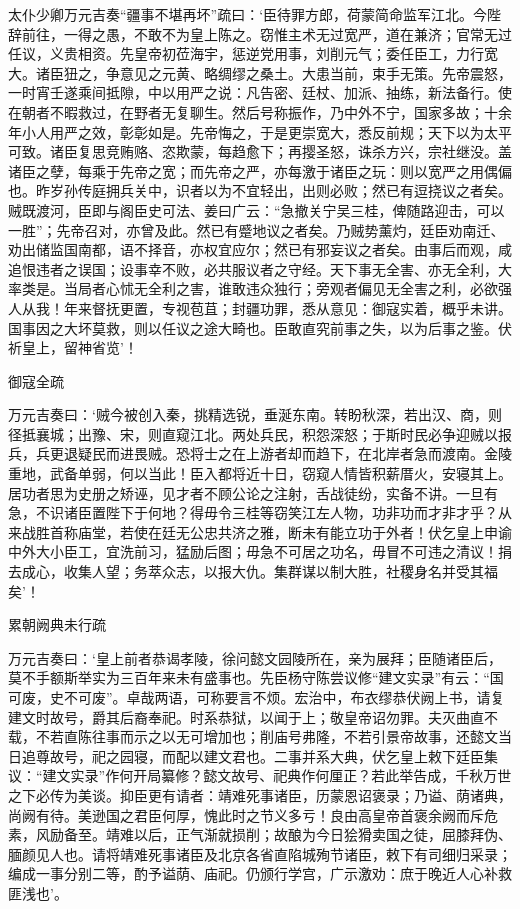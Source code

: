 \documentclass[]{article}
\begin{document}
太仆少卿万元吉奏``疆事不堪再坏''疏曰：`臣待罪方郎，荷蒙简命监军江北。今陛辞前往，一得之愚，不敢不为皇上陈之。窃惟主术无过宽严，道在兼济；官常无过任议，义贵相资。先皇帝初莅海宇，惩逆党用事，刘削元气；委任臣工，力行宽大。诸臣狃之，争意见之元黄、略绸缪之桑土。大患当前，束手无策。先帝震怒，一时宵壬遂乘间抵隙，中以用严之说：凡告密、廷杖、加派、抽练，新法备行。使在朝者不暇救过，在野者无复聊生。然后号称振作，乃中外不宁，国家多故；十余年小人用严之效，彰彰如是。先帝悔之，于是更崇宽大，悉反前规；天下以为太平可致。诸臣复思竞贿赂、恣欺蒙，每趋愈下；再撄圣怒，诛杀方兴，宗社继没。盖诸臣之孽，每乘于先帝之宽；而先帝之严，亦每激于诸臣之玩：则以宽严之用偶偏也。昨岁孙传庭拥兵关中，识者以为不宜轻出，出则必败；然已有逗挠议之者矣。贼既渡河，臣即与阁臣史可法、姜曰广云：``急撤关宁吴三桂，俾随路迎击，可以一胜''；先帝召对，亦曾及此。然已有蹙地议之者矣。乃贼势薰灼，廷臣劝南迁、劝出储监国南都，语不择音，亦权宜应尔；然已有邪妄议之者矣。由事后而观，咸追恨违者之误国；设事幸不败，必共服议者之守经。天下事无全害、亦无全利，大率类是。当局者心怵无全利之害，谁敢违众独行；旁观者偏见无全害之利，必欲强人从我！年来督抚更置，专视苞苴；封疆功罪，悉从意见：御寇实着，概乎未讲。国事因之大坏莫救，则以任议之途大畸也。臣敢直究前事之失，以为后事之鉴。伏祈皇上，留神省览'！

御寇全疏

万元吉奏曰：`贼今被创入秦，挑精选锐，垂涎东南。转盼秋深，若出汉、商，则径抵襄城；出豫、宋，则直窥江北。两处兵民，积怨深怒；于斯时民必争迎贼以报兵，兵更退疑民而进畏贼。恐将士之在上游者却而趋下，在北岸者急而渡南。金陵重地，武备单弱，何以当此！臣入都将近十日，窃窥人情皆积薪厝火，安寝其上。居功者思为史册之矫诬，见才者不顾公论之注射，舌战徒纷，实备不讲。一旦有急，不识诸臣置陛下于何地？得毋令三桂等窃笑江左人物，功非功而才非才乎？从来战胜首称庙堂，若使在廷无公忠共济之雅，断未有能立功于外者！伏乞皇上申谕中外大小臣工，宜洗前习，猛励后图；毋急不可居之功名，毋冒不可违之清议！捐去成心，收集人望；务萃众志，以报大仇。集群谋以制大胜，社稷身名并受其福矣'！

累朝阙典未行疏

万元吉奏曰：`皇上前者恭谒孝陵，徐问懿文园陵所在，亲为展拜；臣随诸臣后，莫不手额斯举实为三百年来未有盛事也。先臣杨守陈尝议修``建文实录''有云：``国可废，史不可废''。卓哉两语，可称要言不烦。宏治中，布衣缪恭伏阙上书，请复建文时故号，爵其后裔奉祀。时系恭狱，以闻于上；敬皇帝诏勿罪。夫灭曲直不载，不若直陈往事而示之以无可增加也；削庙号弗隆，不若引景帝故事，还懿文当日追尊故号，祀之园寝，而配以建文君也。二事并系大典，伏乞皇上敕下廷臣集议：``建文实录''作何开局纂修？懿文故号、祀典作何厘正？若此举告成，千秋万世之下必传为美谈。抑臣更有请者：靖难死事诸臣，历蒙恩诏褒录；乃谥、荫诸典，尚阙有待。美逊国之君臣何厚，愧此时之节义多亏！良由高皇帝首褒余阙而斥危素，风励备至。靖难以后，正气渐就损削；故酿为今日狯猾卖国之徒，屈膝拜伪、腼颜见人也。请将靖难死事诸臣及北京各省直陷城殉节诸臣，敕下有司细归采录；编成一事分别二等，酌予谥荫、庙祀。仍颁行学宫，广示激劝：庶于晚近人心补救匪浅也'。
\end{document}
